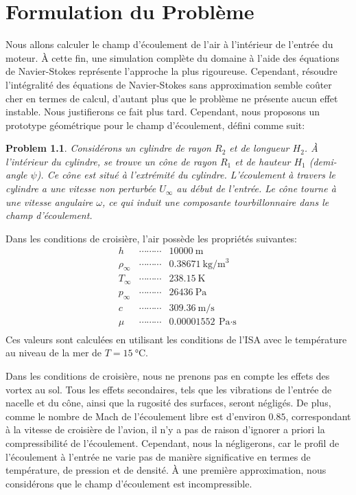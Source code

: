 \documentclass[12pt]{book}
\theoremstyle{bfnote}
\theoremstyle{bfnote}
\newtheorem{problem}{Problem}[chapter]
\begin{document}
\chapter{Formulation du Problème} %
\label{chap:Formulation_du_Probleme}
Nous allons calculer le champ d'écoulement de l'air à l'intérieur de l'entrée du moteur. À cette fin, une simulation complète du domaine à l'aide des équations de Navier-Stokes représente l'approche la plus rigoureuse. Cependant, résoudre l'intégralité des équations de Navier-Stokes sans approximation semble coûter cher en termes de calcul, d'autant plus que le problème ne présente aucun effet instable. Nous justifierons ce fait plus tard. Cependant, nous proposons un prototype géométrique pour le champ d'écoulement, défini comme suit:

\begin{problem}
    Considérons un cylindre de rayon $R_2$ et de longueur $H_2$. À l'intérieur du cylindre, se trouve un cône de rayon $R_1$ et de hauteur $H_1$ (demi-angle $\psi$). Ce cône est situé à l'extrémité du cylindre. L'écoulement à travers le cylindre a une vitesse non perturbée $U_{\infty}$ au début de l'entrée. Le cône tourne à une vitesse angulaire $\omega$, ce qui induit une composante tourbillonnaire dans le champ d'écoulement.
\end{problem}

Dans les conditions de croisière, l'air possède les propriétés suivantes:
\[
\begin{array}{lcl}
    h & \cdots\cdots\cdots & \SI{10000}{\meter} \\
    \rho_\infty & \cdots\cdots\cdots & \SI{0.38671}{\kilogram\per\meter^3} \\
    T_\infty & \cdots\cdots\cdots & \SI{238.15}{\kelvin} \\
    p_\infty & \cdots\cdots\cdots & \SI{26436}{\pascal} \\
    c & \cdots\cdots\cdots & \SI{309.36}{\meter\per\second} \\
    \mu & \cdots\cdots\cdots & \SI{0.00001552}{\pascal\cdot\second} \\
\end{array}
\]
Ces valeurs sont calculées en utilisant les conditions de l'ISA avec le température au niveau de la mer de $T = \SI{15}{\degreeCelsius}$.

Dans les conditions de croisière, nous ne prenons pas en compte les effets des vortex au sol. Tous les effets secondaires, tels que les vibrations de l'entrée de nacelle et du cône, ainsi que la rugosité des surfaces, seront négligés. De plus, comme le nombre de Mach de l'écoulement libre est d'environ $0.85$, correspondant à la vitesse de croisière de l'avion, il n'y a pas de raison d'ignorer a priori la compressibilité de l'écoulement. Cependant, nous la négligerons, car le profil de l'écoulement à l'entrée ne varie pas de manière significative en termes de température, de pression et de densité. À une première approximation, nous considérons que le champ d'écoulement est incompressible.
\end{document}
